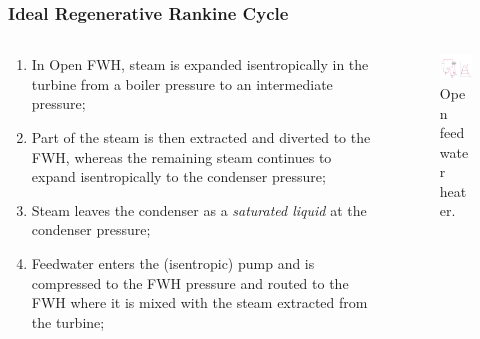 \documentclass[10pt,compress,handout,ignorenonframetext]{beamer}
\begin{document}
\begin{frame}
 \frametitle{Ideal Regenerative Rankine Cycle}

  \begin{columns}
   \begin{column}[c]{0.5\linewidth}
    \begin{enumerate} %
     \item <1-> In Open FWH, steam is expanded isentropically in the turbine from a boiler pressure to an intermediate pressure;
     \item <2-> Part of the steam is then extracted and diverted to the FWH, whereas the remaining steam continues to expand isentropically to the condenser pressure;
      \item <3-> Steam leaves the condenser as a {\it saturated liquid} at the condenser pressure; 
      \item <4-> Feedwater enters the (isentropic) pump and is compressed to the FWH pressure and routed to the FWH where it is mixed with the steam extracted from the turbine;
    \end{enumerate} 
   \end{column}

   \begin{column}[c]{0.5\linewidth} 
     \begin{figure}%
     \begin{center}
      \includegraphics[width=6.25cm,clip]{./Pics/Regenerative_Rankine_Cycle_OpenFWH}
      \caption{\scriptsize Open feedwater heater.} 
     \end{center}
    \end{figure}  
   \end{column}
  \end{columns}
 \normalsize
\end{frame}
\end{document}
